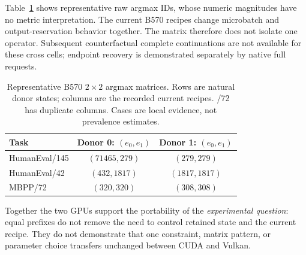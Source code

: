 Table~\ref{tab:cross} shows representative raw argmax IDs, whose numeric magnitudes have no metric interpretation. The current B570 recipes change microbatch and output-reservation behavior together. The matrix therefore does not isolate one operator. Subsequent counterfactual complete continuations are not available for these cross cells; endpoint recovery is demonstrated separately by native full requests.

\begin{table}[t]
\centering\footnotesize\setlength{\tabcolsep}{3pt}
\caption{Representative B570 $2\times2$ argmax matrices. Rows are natural donor states; columns are the recorded current recipes. /72 has duplicate columns. Cases are local evidence, not prevalence estimates.}
\label{tab:cross}
\begin{tabular}{lcc}\toprule
Task & Donor 0: $(e_0,e_1)$ & Donor 1: $(e_0,e_1)$\\\midrule
HumanEval/145 & $(71465,279)$ & $(279,279)$\\
HumanEval/42 & $(432,1817)$ & $(1817,1817)$\\
MBPP/72 & $(320,320)$ & $(308,308)$\\\bottomrule
\end{tabular}
\end{table}

Together the two GPUs support the portability of the \emph{experimental question}: equal prefixes do not remove the need to control retained state and the current recipe. They do not demonstrate that one constraint, matrix pattern, or parameter choice transfers unchanged between CUDA and Vulkan.

